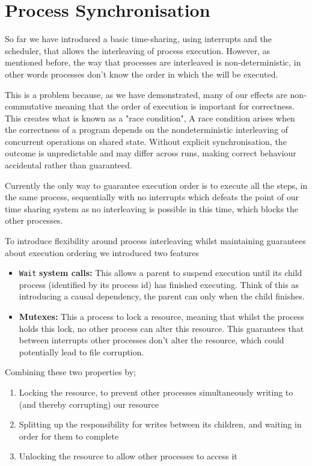 \documentclass[logo,bsc,singlespacing,parskip]{infthesis}
\begin{document}
\section{Process Synchronisation}
So far we have introduced a basic time-sharing, using interrupts and the scheduler, that allows the interleaving of process execution. However, as mentioned before, the way that processes are interleaved is non-deterministic, in other words processes don't know the order in which the will be executed. 

This is a problem because, as we have demonstrated, many of our effects are non-commutative meaning that the order of execution is important for correctness. This creates what is known as a "race condition", A race condition arises when the correctness of a program depends on the nondeterministic interleaving of concurrent operations on shared state. Without explicit synchronisation, the outcome is unpredictable and may differ across runs, making correct behaviour accidental rather than guaranteed.

Currently the only way to guarantee execution order is to execute all the steps, in the same process, sequentially with no interrupts which defeats the point of our time sharing system as no interleaving is possible in this time, which blocks the other processes.

To introduce flexibility around process interleaving whilst maintaining guarantees about execution ordering we introduced two features
\begin{itemize}
    \item \lstinline{Wait} \textbf{system calls: } This allows a parent to suspend execution until its child process (identified by its process id) has finished executing. Think of this as introducing a causal dependency, the parent can only when the child finishes.
    \item \textbf{Mutexes: } This a process to lock a resource, meaning that whilst the process holds this lock, no other process can alter this resource. This guarantees that between interrupts other processes don't alter the resource, which could potentially lead to file corruption. 
\end{itemize}

Combining these two properties by;
\begin{enumerate}
    \item Locking the resource, to prevent other processes simultaneously writing to (and thereby corrupting) our resource
    \item Splitting up the responsibility for writes between its children, and waiting in order for them to complete
    \item Unlocking the resource to allow other processes to access it
\end{enumerate}
\end{document}
